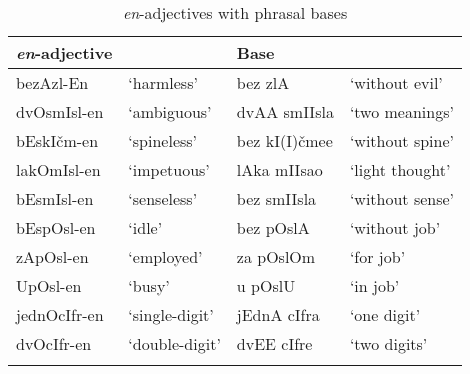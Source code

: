 \documentclass[output=paper]{langsci/langscibook}
\begin{document}
\begin{table}
\caption{\textit{en}-adjectives with phrasal bases}          
\label{tabapp14}          
 \begin{tabular}{ l l l l}          
\lsptoprule            
\textit{en}-adjective &  & Base &    \\ 
\hline
bezAzl-En & `harmless' & bez zlA & `without evil' \\  
dvOsmIsl-en & `ambiguous' & dvAA smIIsla & `two meanings'\\
bEskIčm-en & `spineless' & bez kI(I)čmee & `without spine'\\ 
lakOmIsl-en & `impetuous' & lAka mIIsao & `light thought'\\ 
bEsmIsl-en & `senseless' & bez smIIsla & `without sense'  \\ 
bEspOsl-en & `idle' & bez pOslA & `without job' \\
zApOsl-en & `employed' & za pOslOm & `for job' \\  
UpOsl-en  & `busy' & u pOslU & `in job' \\
jednOcIfr-en & `single-digit' & jEdnA cIfra & `one digit' \\
dvOcIfr-en & `double-digit' & dvEE cIfre & `two digits' \\
 \lspbottomrule      
 \end{tabular}          
\end{table}           
\end{document}
